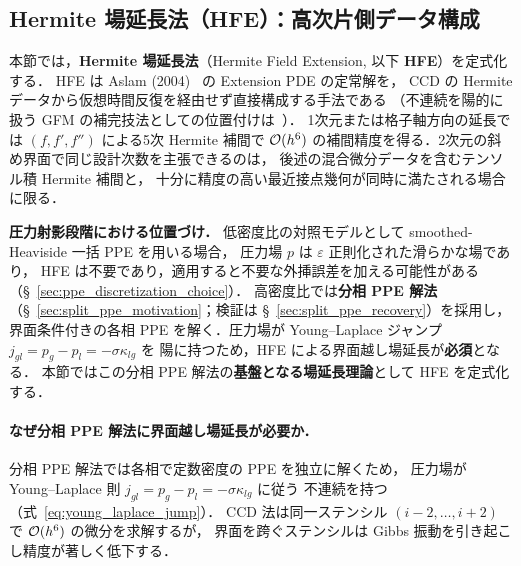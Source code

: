 %
%
\subsection{Hermite 場延長法（HFE）：高次片側データ構成}
\label{sec:field_extension}
\label{sec:hfe}%
\label{sec:extension_pde}%
\label{sec:gfm}%

本節では，\textbf{Hermite 場延長法}（Hermite Field Extension, 以下 \textbf{HFE}）を定式化する．
HFE は Aslam (2004)~\cite{Aslam2004} の Extension PDE の定常解を，
CCD の Hermite データから仮想時間反復を経由せず直接構成する手法である
（不連続を陽的に扱う GFM の補完技法としての位置付けは~\cite{Kang2000,Fedkiw1999}）．
1次元または格子軸方向の延長では $(f, f', f'')$ による5次 Hermite 補間で
$\mathcal{O}(h^6)$ の補間精度を得る．2次元の斜め界面で同じ設計次数を主張できるのは，
後述の混合微分データを含むテンソル積 Hermite 補間と，
十分に精度の高い最近接点幾何が同時に満たされる場合に限る．

\noindent\textbf{圧力射影段階における位置づけ．}
低密度比の対照モデルとして smoothed-Heaviside 一括 PPE を用いる場合，
圧力場 $p$ は $\varepsilon$ 正則化された滑らかな場であり，
HFE は不要であり，適用すると不要な外挿誤差を加える可能性がある
（§~\ref{sec:ppe_discretization_choice}）．
高密度比では\textbf{分相 PPE 解法}
（§~\ref{sec:split_ppe_motivation}；検証は §~\ref{sec:split_ppe_recovery}）を採用し，
界面条件付きの各相 PPE を解く．圧力場が Young--Laplace ジャンプ
$j_{gl}=p_g-p_l=-\sigma\kappa_{lg}$ を
陽に持つため，HFE による界面越し場延長が\textbf{必須}となる．
本節ではこの分相 PPE 解法の\textbf{基盤となる場延長理論}として HFE を定式化する．

\paragraph{なぜ分相 PPE 解法に界面越し場延長が必要か．}
分相 PPE 解法では各相で定数密度の PPE を独立に解くため，
圧力場が Young--Laplace 則 $j_{gl}=p_g-p_l=-\sigma\kappa_{lg}$ に従う
不連続を持つ（式~\eqref{eq:young_laplace_jump}）．
CCD 法は同一ステンシル $(i-2,\ldots,i+2)$ で $\mathcal{O}(h^6)$ の微分を求解するが，
界面を跨ぐステンシルは Gibbs 振動を引き起こし精度が著しく低下する．

